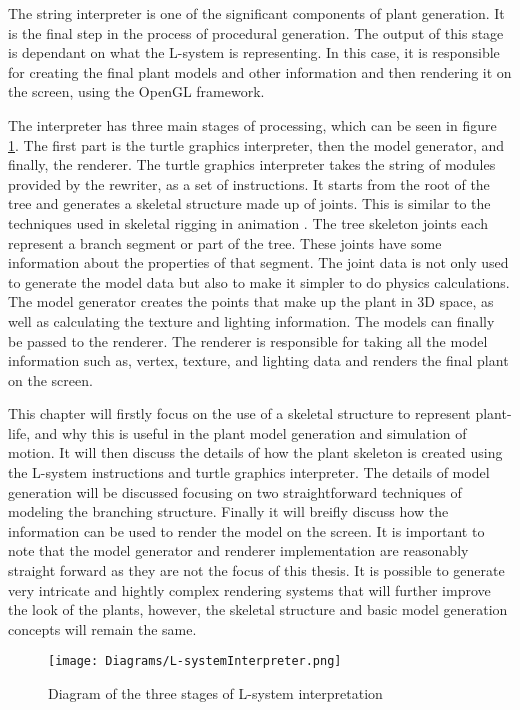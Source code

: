 
\lettrine[lines=3]{T}{}he string interpreter is one of the significant components of plant generation. It is the final step in the process of procedural generation. The output of this stage is dependant on what the L-system is representing. In this case, it is responsible for creating the final plant models and other information and then rendering it on the screen, using the OpenGL framework. 

The interpreter has three main stages of processing, which can be seen in figure \ref{l-system interpreter}. The first part is the turtle graphics interpreter, then the model generator, and finally, the renderer. The turtle graphics interpreter takes the string of modules provided by the rewriter, as a set of instructions. It starts from the root of the tree and generates a skeletal structure made up of joints. This is similar to the techniques used in skeletal rigging in animation \cite{gregory2014game}. The tree skeleton joints each represent a branch segment or part of the tree. These joints have some information about the properties of that segment. The joint data is not only used to generate the model data but also to make it simpler to do physics calculations. The model generator creates the points that make up the plant in 3D space, as well as calculating the texture and lighting information. The models can finally be passed to the renderer. The renderer is responsible for taking all the model information such as, vertex, texture, and lighting data and renders the final plant on the screen. 

This chapter will firstly focus on the use of a skeletal structure to represent plant-life, and why this is useful in the plant model generation and simulation of motion. It will then discuss the details of how the plant skeleton is created using the L-system instructions and turtle graphics interpreter. The details of model generation will be discussed focusing on two straightforward techniques of modeling the branching structure. Finally it will breifly discuss how the information can be used to render the model on the screen. It is important to note that the model generator and renderer implementation are reasonably straight forward as they are not the focus of this thesis. It is possible to generate very intricate and hightly complex rendering systems that will further improve the look of the plants, however, the skeletal structure and basic model generation concepts will remain the same.

\begin{figure}[htbp]
	{\centering
		\vspace{7px}
		\texttt{[image: Diagrams/L-systemInterpreter.png]}
		\caption{Diagram of the three stages of L-system interpretation} \label{l-system interpreter}
	}
\end{figure}
\FloatBarrier

